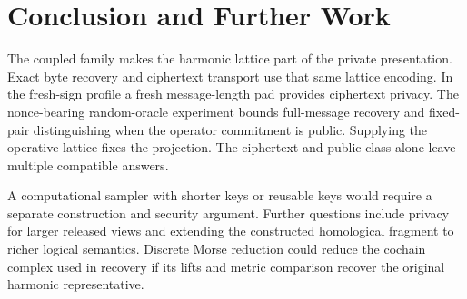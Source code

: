 \section*{Conclusion and Further Work}

The coupled family makes the harmonic lattice part of the private
presentation. Exact byte recovery and ciphertext transport use that same
lattice encoding. In the fresh-sign profile a fresh message-length pad
provides ciphertext privacy. The nonce-bearing random-oracle experiment
bounds full-message recovery and fixed-pair distinguishing when the
operator commitment is public. Supplying the operative lattice fixes the
projection. The ciphertext and public class alone leave multiple
compatible answers.

A computational sampler with shorter keys or reusable keys would require
a separate construction and security argument. Further questions include
privacy for larger released views and extending the constructed homological
fragment to richer logical semantics. Discrete Morse reduction
\cite{curryGhristNanda2015morse} could reduce the cochain complex used in
recovery if its lifts and metric comparison recover the original harmonic
representative.

